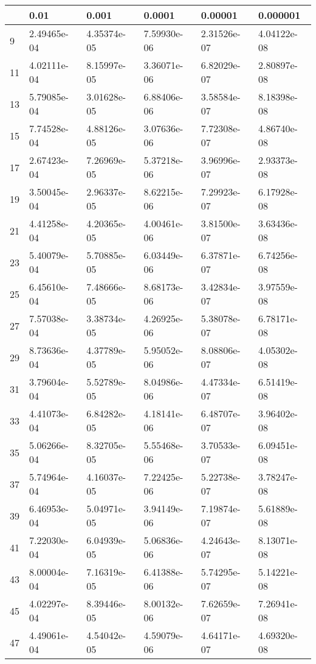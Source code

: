 \documentclass{article}
\begin{document}
\begin{table}[H]
\centering
\begin{tabular}{|l|l|l|l|l|l|}
\hline
& 0.01 & 0.001 & 0.0001 & 0.00001 & 0.000001 \\ \hline
9 & 2.49465e-04 & 4.35374e-05 & 7.59930e-06 & 2.31526e-07 & 4.04122e-08 \\ \hline
11 & 4.02111e-04 & 8.15997e-05 & 3.36071e-06 & 6.82029e-07 & 2.80897e-08 \\ \hline
13 & 5.79085e-04 & 3.01628e-05 & 6.88406e-06 & 3.58584e-07 & 8.18398e-08 \\ \hline
15 & 7.74528e-04 & 4.88126e-05 & 3.07636e-06 & 7.72308e-07 & 4.86740e-08 \\ \hline
17 & 2.67423e-04 & 7.26969e-05 & 5.37218e-06 & 3.96996e-07 & 2.93373e-08 \\ \hline
19 & 3.50045e-04 & 2.96337e-05 & 8.62215e-06 & 7.29923e-07 & 6.17928e-08 \\ \hline
21 & 4.41258e-04 & 4.20365e-05 & 4.00461e-06 & 3.81500e-07 & 3.63436e-08 \\ \hline
23 & 5.40079e-04 & 5.70885e-05 & 6.03449e-06 & 6.37871e-07 & 6.74256e-08 \\ \hline
25 & 6.45610e-04 & 7.48666e-05 & 8.68173e-06 & 3.42834e-07 & 3.97559e-08 \\ \hline
27 & 7.57038e-04 & 3.38734e-05 & 4.26925e-06 & 5.38078e-07 & 6.78171e-08 \\ \hline
29 & 8.73636e-04 & 4.37789e-05 & 5.95052e-06 & 8.08806e-07 & 4.05302e-08 \\ \hline
31 & 3.79604e-04 & 5.52789e-05 & 8.04986e-06 & 4.47334e-07 & 6.51419e-08 \\ \hline
33 & 4.41073e-04 & 6.84282e-05 & 4.18141e-06 & 6.48707e-07 & 3.96402e-08 \\ \hline
35 & 5.06266e-04 & 8.32705e-05 & 5.55468e-06 & 3.70533e-07 & 6.09451e-08 \\ \hline
37 & 5.74964e-04 & 4.16037e-05 & 7.22425e-06 & 5.22738e-07 & 3.78247e-08 \\ \hline
39 & 6.46953e-04 & 5.04971e-05 & 3.94149e-06 & 7.19874e-07 & 5.61889e-08 \\ \hline
41 & 7.22030e-04 & 6.04939e-05 & 5.06836e-06 & 4.24643e-07 & 8.13071e-08 \\ \hline
43 & 8.00004e-04 & 7.16319e-05 & 6.41388e-06 & 5.74295e-07 & 5.14221e-08 \\ \hline
45 & 4.02297e-04 & 8.39446e-05 & 8.00132e-06 & 7.62659e-07 & 7.26941e-08 \\ \hline
47 & 4.49061e-04 & 4.54042e-05 & 4.59079e-06 & 4.64171e-07 & 4.69320e-08 \\ \hline

\end{tabular}
\end{table}
\end{document}

